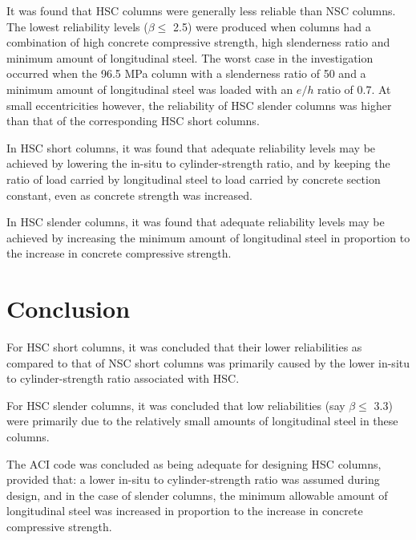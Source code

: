 \documentclass[a4paper]{article}
\begin{document}
It was found that HSC columns were generally less reliable than NSC columns.
The lowest reliability levels ($\beta \leq$ 2.5) were produced when columns 
had a combination of high concrete compressive strength, high slenderness ratio
and minimum amount of longitudinal steel. 
The worst case in the investigation occurred when the 96.5 MPa column with a 
slenderness ratio of 50 and a minimum amount of longitudinal steel was loaded
with an $e/h$ ratio of 0.7.
At small eccentricities however, the reliability of HSC slender columns was
higher than that of the corresponding HSC short columns.

In HSC short columns, it was found that adequate reliability levels may 
be achieved by lowering the in-situ to cylinder-strength ratio, and by keeping
the ratio of load carried by longitudinal steel to load carried by
concrete section constant, even as concrete strength was increased.

In HSC slender columns, it was found that adequate reliability levels may
be achieved by increasing the minimum amount of longitudinal steel in proportion
to the increase in concrete compressive strength.  


\section*{Conclusion}
For HSC short columns, it was concluded that their lower reliabilities as
compared to that of NSC short columns was primarily caused by the lower 
in-situ to cylinder-strength ratio associated with HSC.

For HSC slender columns, it was concluded that low reliabilities 
(say $\beta \leq$ 3.3) were primarily due to the relatively small amounts of 
longitudinal steel in these columns.

The ACI code was concluded as being adequate for designing HSC columns, provided
that: a lower in-situ to cylinder-strength ratio was assumed during design, and
in the case of slender columns, the minimum allowable amount of longitudinal
steel was increased in proportion to the increase in concrete compressive strength.
\end{document}
